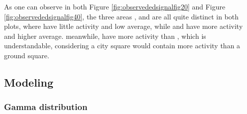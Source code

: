 \documentclass[12pt,a4paper,twoside]{article}
\begin{document}
\noindent As one can observe in both Figure \ref{fig:observededsignalfig20} and Figure \ref{fig:observededsignalfig40},
the three areas ,  and  are all quite distinct in both plots, where  have little
activity and low average, while  and  have more activity and higher average. meanwhile, 
have more activity than , which is understandable, considering a city square would contain more activity than a
ground square.

\newpage

\subsection{Modeling}
\label{ssec:modeling}
\subsubsection{Gamma distribution}
\label{sssec:gamma}
\end{document}
